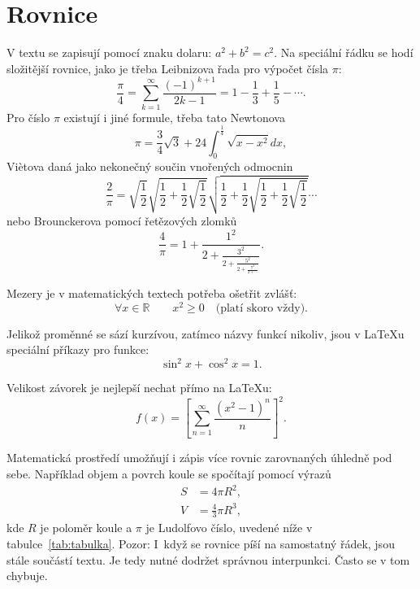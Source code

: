 \documentclass{article}
\begin{document}
	\section{Rovnice}
	V textu se zapisují pomocí znaku dolaru: $a^2+b^2=c^2$.
	Na speciální řádku se hodí složitější rovnice, jako je třeba Leibnizova řada pro výpočet čísla $\pi$:
	\begin{equation}
		\frac{\pi}{4}=\sum_{k=1}^{\infty}\frac{(-1)^{k+1}}{2k-1}
			=1-\frac{1}{3}+\frac{1}{5}-\dotsb.
	\end{equation}
	Pro číslo $\pi$ existují i jiné formule, třeba tato Newtonova
	\begin{equation}
		\pi=\frac{3}{4}\sqrt{3}+24\int_{0}^{\frac{1}{4}}\sqrt{x-x^2}dx,
	\end{equation}
	Vi\`etova daná jako nekonečný součin vnořených odmocnin
	\begin{equation}
		\frac{2}{\pi}=\sqrt{\frac{1}{2}}\sqrt{\frac{1}{2}+\frac{1}{2}\sqrt{\frac{1}{2}}}\sqrt{\frac{1}{2}+\frac{1}{2}\sqrt{\frac{1}{2}+\frac{1}{2}\sqrt{\frac{1}{2}}}}\dotsb
	\end{equation}
	nebo Brounckerova pomocí řetězových zlomků~\cite{Beckmann1998}
	\begin{equation}
		\label{eq:Brouncker}
		\frac{4}{\pi}=1+\frac{1^2}{2+\frac{3^2}{
			2+\frac{5^2}{
				2+\frac{7^2}{2+\dotsb}
			}
		}}.
	\end{equation}
	
	Mezery je v matematických textech potřeba ošetřit zvlášť:
	\begin{equation}
		\forall x\in\mathbb{R}\qquad x^{2}\geq0 \quad\textrm{(platí skoro vždy)}.
	\end{equation}
	
	Jelikož proměnné se sází kurzívou, zatímco názvy funkcí nikoliv,
	jsou v \LaTeX u speciální příkazy pro funkce:
	\begin{equation}
		\sin^{2}x+\cos^2{x}=1.
	\end{equation}
	
	Velikost závorek je nejlepší nechat přímo na \LaTeX u:
	\begin{equation}
		f(x)=\left[\sum_{n=1}^{\infty}\frac{\left(x^2-1\right)^n}{n}\right]^2.
	\end{equation}
	
	Matematická prostředí umožňují i zápis více rovnic zarovnaných úhledně pod sebe.
	Například objem a povrch koule se spočítají pomocí výrazů
	\begin{align}
		S&=4\pi R^{2},\\
		V&=\frac{4}{3}\pi R^{3},
	\end{align}
	kde $R$ je poloměr koule a $\pi$ je Ludolfovo číslo, uvedené níže v tabulce~\ref{tab:tabulka}.
	Pozor: I~když se rovnice píší na samostatný řádek, jsou stále součástí textu.
	Je tedy nutné dodržet správnou interpunkci.
	Často se v tom chybuje.
	
\end{document}
